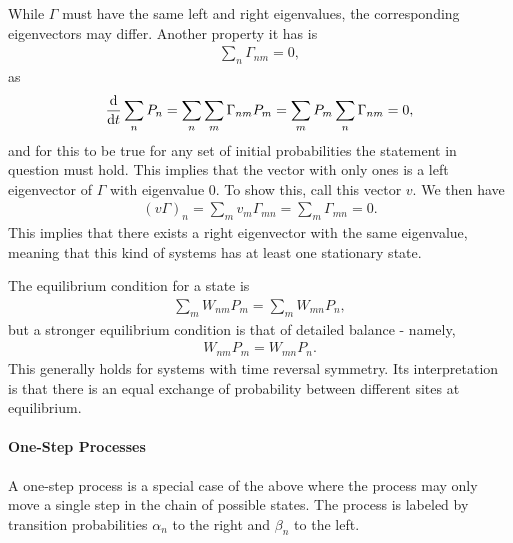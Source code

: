 While $\Gamma$ must have the same left and right eigenvalues, the corresponding eigenvectors may differ. Another property it has is
\begin{align*}
	\sum\limits_{n}\Gamma_{nm} = 0,
\end{align*}
as
\begin{align*}
	\dv{t}\sum\limits_{n}P_{n} = \sum\limits_{n}\sum\limits_{m}\Gamma_{nm}P_{m} = \sum\limits_{m}P_{m}\sum\limits_{n}\Gamma_{nm} = 0,
\end{align*}
and for this to be true for any set of initial probabilities the statement in question must hold. This implies that the vector with only ones is a left eigenvector of $\Gamma$ with eigenvalue $0$. To show this, call this vector $v$. We then have
\begin{align*}
	(v\Gamma)_{n} = \sum\limits_{m}v_{m}\Gamma_{mn} = \sum\limits_{m}\Gamma_{mn} = 0.
\end{align*}
This implies that there exists a right eigenvector with the same eigenvalue, meaning that this kind of systems has at least one stationary state.

The equilibrium condition for a state is
\begin{align*}
	\sum\limits_{m}W_{nm}P_{m} = \sum\limits_{m}W_{mn}P_{n},
\end{align*}
but a stronger equilibrium condition is that of detailed balance - namely,
\begin{align*}
	W_{nm}P_{m} = W_{mn}P_{n}.
\end{align*}
This generally holds for systems with time reversal symmetry. Its interpretation is that there is an equal exchange of probability between different sites at equilibrium.

\paragraph{One-Step Processes}
A one-step process is a special case of the above where the process may only move a single step in the chain of possible states. The process is labeled by transition probabilities $\alpha_{n}$ to the right and $\beta_{n}$ to the left.